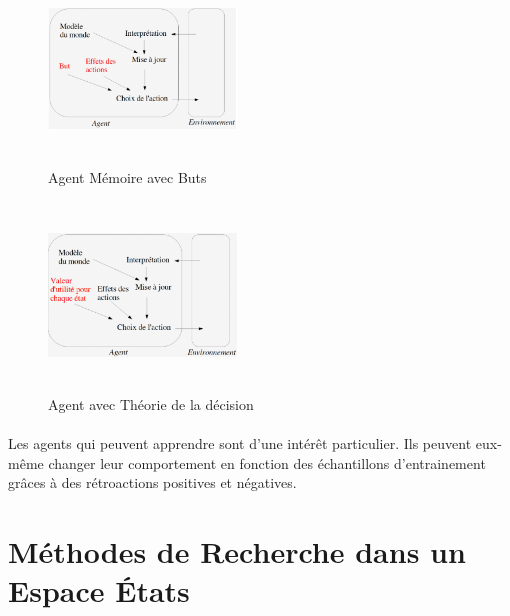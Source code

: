 \documentclass[oneside]{book}
\begin{document}
\begin{figure}[!ht]
\centering
\includegraphics[width=5cm, height=5cm, keepaspectratio]{Agent_Memoire_But.png}
\caption{Agent Mémoire avec Buts}
\label{fig:agentmembut}
\end{figure}
	
\begin{figure}[!ht]
\centering
\includegraphics[width=5cm, height=5cm, keepaspectratio]{Agent_Memoire_Theorie.png}
\caption{Agent avec Théorie de la décision}
\label{fig:agenttheorie}
\end{figure}
\paragraph{}
Les agents qui peuvent apprendre sont d'une intérêt particulier. Ils peuvent eux-même changer leur comportement en fonction des échantillons d'entrainement grâces à des rétroactions positives et négatives.
\section{Méthodes de Recherche dans un Espace États}
\end{document}
